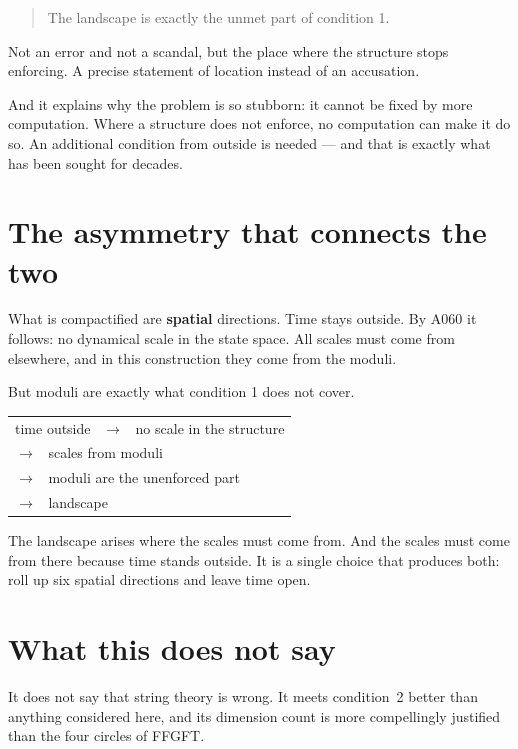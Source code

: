 \begin{quote}
The landscape is exactly the unmet part of condition 1.
\end{quote}

Not an error and not a scandal, but the place where the structure stops
enforcing. A precise statement of location instead of an accusation.

And it explains why the problem is so stubborn: it cannot be fixed by
more computation. Where a structure does not enforce, no computation
can make it do so. An additional condition from outside is needed ---
and that is exactly what has been sought for decades.

\section{The asymmetry that connects the two}

What is compactified are \textbf{spatial} directions. Time stays
outside. By A060 it follows: no dynamical scale in the state space. All
scales must come from elsewhere, and in this construction they come
from the moduli.

But moduli are exactly what condition 1 does not cover.
\begin{center}
\begin{tabular}{l}
time outside \ $\to$ \ no scale in the structure \\
\phantom{time outside} $\to$ \ scales from moduli \\
\phantom{time outside} $\to$ \ moduli are the unenforced part \\
\phantom{time outside} $\to$ \ landscape \\
\end{tabular}
\end{center}

The landscape arises where the scales must come from. And the scales
must come from there because time stands outside. It is a single choice
that produces both: roll up six spatial directions and leave time open.

\section{What this does not say}

It does not say that string theory is wrong. It meets condition~2
better than anything considered here, and its dimension count is more
compellingly justified than the four circles of FFGFT.

